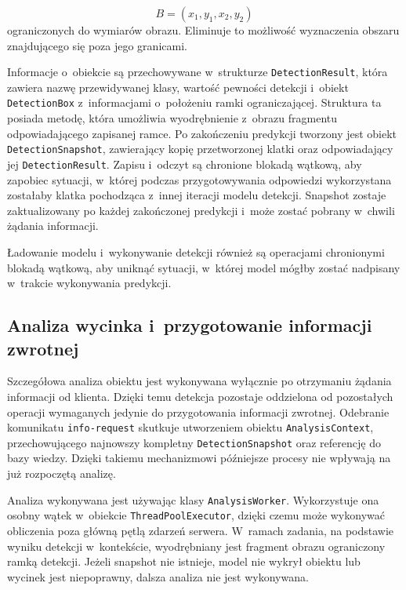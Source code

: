 \begin{equation}
    B = (x_1,y_1,x_2,y_2)
\end{equation}
ograniczonych do wymiarów obrazu. Eliminuje to możliwość wyznaczenia obszaru znajdującego się poza jego granicami.

Informacje o~obiekcie są przechowywane w~strukturze \texttt{DetectionResult}, która zawiera nazwę przewidywanej klasy, wartość pewności detekcji i~obiekt \texttt{DetectionBox} z~informacjami o~położeniu ramki ograniczającej. Struktura ta posiada metodę, która umożliwia wyodrębnienie z~obrazu fragmentu odpowiadającego zapisanej ramce. Po zakończeniu predykcji tworzony jest obiekt \texttt{DetectionSnapshot}, zawierający kopię przetworzonej klatki oraz odpowiadający jej \texttt{DetectionResult}. Zapisu i~odczyt są chronione blokadą wątkową, aby zapobiec sytuacji, w~której podczas przygotowywania odpowiedzi wykorzystana zostałaby klatka pochodząca z~innej iteracji modelu detekcji. Snapshot zostaje zaktualizowany po każdej zakończonej predykcji i~może zostać pobrany w~chwili żądania informacji.

Ładowanie modelu i~wykonywanie detekcji również są operacjami chronionymi blokadą wątkową, aby uniknąć sytuacji, w~której model mógłby zostać nadpisany w~trakcie wykonywania predykcji.

\subsection{Analiza wycinka i~przygotowanie informacji zwrotnej}

Szczegółowa analiza obiektu jest wykonywana wyłącznie po otrzymaniu żądania informacji od klienta. Dzięki temu detekcja pozostaje oddzielona od pozostałych operacji wymaganych jedynie do przygotowania informacji zwrotnej. Odebranie komunikatu \texttt{info-request} skutkuje utworzeniem obiektu \texttt{AnalysisContext}, przechowującego najnowszy kompletny \texttt{DetectionSnapshot} oraz referencję do bazy wiedzy. Dzięki takiemu mechanizmowi późniejsze procesy nie wpływają na już rozpoczętą analizę.

Analiza wykonywana jest używając klasy \texttt{AnalysisWorker}. Wykorzystuje ona osobny wątek w~obiekcie \texttt{ThreadPoolExecutor}, dzięki czemu może wykonywać obliczenia poza główną pętlą zdarzeń serwera. W~ramach zadania, na podstawie wyniku detekcji w~kontekście, wyodrębniany jest fragment obrazu ograniczony ramką detekcji. Jeżeli snapshot nie istnieje, model nie wykrył obiektu lub wycinek jest niepoprawny, dalsza analiza nie jest wykonywana.

